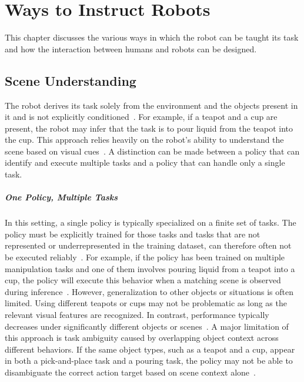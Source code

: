 

\chapter{Ways to Instruct Robots}
\label{chap:WaysToInstructRobots}
\minitoc
This chapter discusses the various ways in which the robot can be taught its task and how the interaction between humans and robots can be designed.
 
\section{Scene Understanding}

The robot derives its task solely from the environment and the objects present in it and is not explicitly conditioned~\cite{jang_BCZZeroShotTask_2022}. For example, if a teapot and a cup are present, the robot may infer that the task is to pour liquid from the teapot into the cup. This approach relies heavily on the robot's ability to understand the scene based on visual cues~\cite{jang_BCZZeroShotTask_2022}.
A distinction can be made between a policy that can identify and execute multiple tasks and a policy that can handle only a single task.

\paragraph{One Policy, Multiple Tasks}
In this setting, a single policy is typically specialized on a finite set of tasks. The policy must be explicitly trained for those tasks and tasks that are not represented or underrepresented in the training dataset, can therefore often not be executed reliably~\cite{_BoostingRoboticManipulation_, mandi_CACTIFrameworkScalable_2023}. For example, if the policy has been trained on multiple manipulation tasks and one of them involves pouring liquid from a teapot into a cup, the policy will execute this behavior when a matching scene is observed during inference~\cite{jang_BCZZeroShotTask_2022}.
However, generalization to other objects or situations is often limited. Using different teapots or cups may not be problematic as long as the relevant visual features are recognized. In contrast, performance typically decreases under significantly different objects or scenes~\cite{jang_BCZZeroShotTask_2022}. 
A major limitation of this approach is task ambiguity caused by overlapping object context across different behaviors. If the same object types, such as a teapot and a cup, appear in both a pick-and-place task and a pouring task, the policy may not be able to disambiguate the correct action target based on scene context alone~\cite{tamar_IMITATIONLEARNINGVISUAL_2018}.


